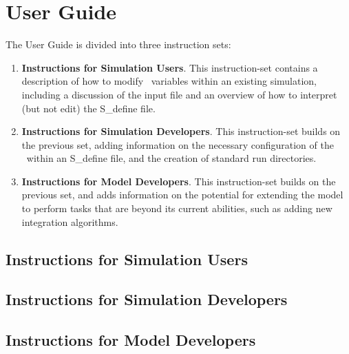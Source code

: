 \chapter{User Guide}\label{ch:user}
The User Guide is divided into three instruction sets:
\begin{enumerate}
 \item \textbf{Instructions for Simulation Users}.  This instruction-set 
 contains a description of how to modify \ModelDesc\ variables within an 
 existing simulation, including a discussion of the input file and 
 an overview of how to interpret (but not edit) the S\_define file.
 \item \textbf{Instructions for Simulation Developers}.  This instruction-set 
 builds on the previous set, adding information on the necessary 
 configuration of the \ModelDesc\ within an S\_define file, and the creation 
 of 
 standard run directories.
 \item \textbf{Instructions for Model Developers}.   This instruction-set 
 builds on the previous set, and adds information on the potential for 
 extending the model to perform tasks that are beyond its current abilities, 
 such as adding new integration algorithms.
\end{enumerate}

\section{Instructions for Simulation Users}\label{sec:guide_sim_user}

\section{Instructions for Simulation Developers}

\section{Instructions for Model Developers}



